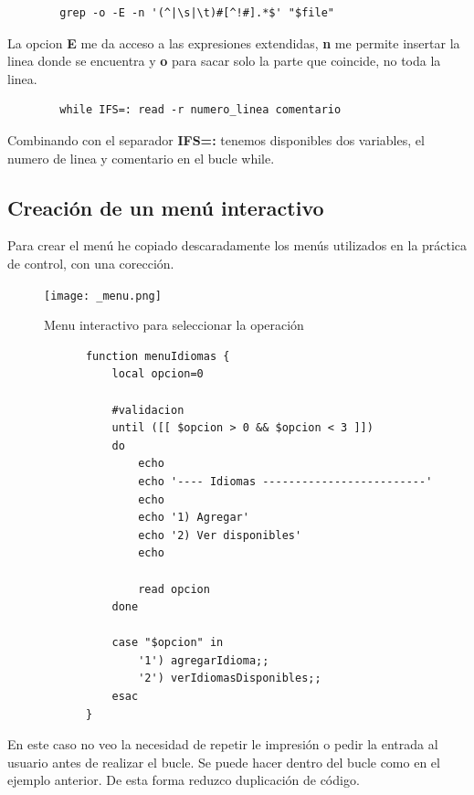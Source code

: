 \documentclass{article}
\begin{document}
        \begin{verbatim}
        grep -o -E -n '(^|\s|\t)#[^!#].*$' "$file" 
        \end{verbatim}

    La opcion \textbf{E} me da acceso a las expresiones extendidas, \textbf{n} me permite insertar la linea donde se encuentra y \textbf{o} para sacar solo la parte que coincide, no toda la linea.

    \begin{verbatim}
        while IFS=: read -r numero_linea comentario
    \end{verbatim}

    Combinando con el separador \textbf{IFS=:} tenemos disponibles dos variables, el numero de linea y comentario en el bucle while.
            
    \subsection{Creación de un menú interactivo}
        Para crear el menú he copiado descaradamente los menús utilizados en la práctica de control, con una corección.

        \begin{figure}
            \centering
            \texttt{[image: \_menu.png]}
            \caption{Menu interactivo para seleccionar la operación}
        \end{figure}

        \newpage

        \begin{verbatim}
            function menuIdiomas {
                local opcion=0
            
                #validacion
                until ([[ $opcion > 0 && $opcion < 3 ]])
                do
                    echo
                    echo '---- Idiomas -------------------------'
                    echo
                    echo '1) Agregar'
                    echo '2) Ver disponibles'
                    echo
            
                    read opcion
                done 
            
                case "$opcion" in 
                    '1') agregarIdioma;;
                    '2') verIdiomasDisponibles;;
                esac
            }
        \end{verbatim}

        En este caso no veo la necesidad de repetir le impresión o pedir la entrada al usuario antes de realizar el bucle. Se puede hacer dentro del bucle como en el ejemplo anterior. De esta forma reduzco duplicación de código.
    
\end{document}
